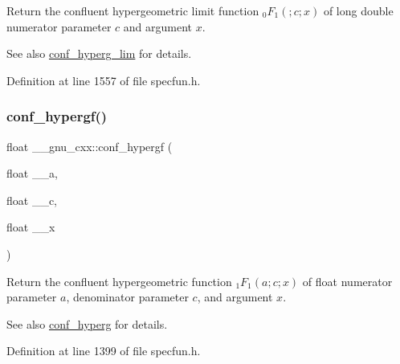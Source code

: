 Return the confluent hypergeometric limit function $ {}_0F_1(;c;x) $ of {\ttfamily long double} numerator parameter $ c $ and argument $ x $.

\begin{DoxySeeAlso}{See also}
\hyperlink{group__gnu__math__spec__func_ga9fe7a5e2e741f56d88fd29bc249feab2}{conf\+\_\+hyperg\+\_\+lim} for details. 
\end{DoxySeeAlso}


Definition at line 1557 of file specfun.\+h.

\mbox{\label{group__gnu__math__spec__func_gabd18e600aa78c3f2b2f835039506c810}} 
\subsubsection{\texorpdfstring{conf\+\_\+hypergf()}{conf\_hypergf()}}
{\footnotesize\ttfamily float \+\_\+\+\_\+gnu\+\_\+cxx\+::conf\+\_\+hypergf (\begin{DoxyParamCaption}\item[{float}]{\+\_\+\+\_\+a,  }\item[{float}]{\+\_\+\+\_\+c,  }\item[{float}]{\+\_\+\+\_\+x }\end{DoxyParamCaption})\hspace{0.3cm}{\ttfamily [inline]}}

Return the confluent hypergeometric function $ {}_1F_1(a;c;x) $ of {\ttfamily float} numerator parameter $ a $, denominator parameter $ c $, and argument $ x $.

\begin{DoxySeeAlso}{See also}
\hyperlink{group__gnu__math__spec__func_ga4d01e85e7d295afca5d9f8b6c68f19cc}{conf\+\_\+hyperg} for details. 
\end{DoxySeeAlso}


Definition at line 1399 of file specfun.\+h.

\mbox{\label{group__gnu__math__spec__func_ga0a9853f30d8fa515a12cd45a92da832e}} 

